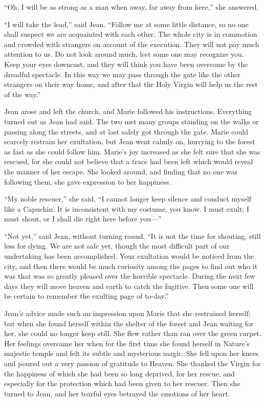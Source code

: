 ``Oh, I will be as strong as a man when away, far away from here,'' she
answered.

``I will take the lead,'' said Jean. ``Follow me at some little
distance, so no one shall suspect we are acquainted with each other. The
whole city is in commotion and crowded with strangers on account of the
execution. They will not pay much attention to us. Do not look around
much, lest some one may recognize you. Keep your eyes downcast, and they
will think you have been overcome by the dreadful spectacle. In this way
we may pass through the gate like the other strangers on their way home,
and after that the Holy Virgin will help us the rest of the way.''

Jean arose and left the church, and Marie followed his instructions.
Everything turned out as Jean had said. The two met many groups standing
on the walks or passing along the streets, and at last safely got
through the gate. Marie could scarcely restrain her exultation, but Jean
went calmly on, hurrying to the forest as fast as she could follow him.
Marie's joy increased as she felt sure that she was rescued, for she
could not believe that a trace had been left which would reveal the
manner of her escape. She looked around, and finding that no one was
following them, she gave expression to her happiness.

``My noble rescuer,'' she said, ``I cannot longer keep silence and
conduct myself like a Capuchin. It is inconsistent with my costume, you
know. I must exult; I must shout, or I shall die right here before
you---''

``Not yet,'' said Jean, without turning round. ``It is not the time for
shouting, still less for dying. We are not safe yet, though the most
difficult part of our undertaking has been accomplished. Your exultation
would be noticed from the city, and then there would be much curiosity
among the pages to find out who it was that was so greatly pleased over
the horrible spectacle. During the next few days they will move heaven
and earth to catch the fugitive. Then some one will be certain to
remember the exulting page of to-day.''

Jean's advice made such an impression upon Marie that she restrained
herself; but when she found herself within the shelter of the forest and
Jean waiting for her, she could no longer keep still. She flew rather
than ran over the green carpet. Her feelings overcame her when for the
first time she found herself in Nature's majestic temple and felt its
subtle and mysterious magic. She fell upon her knees and poured out a
very passion of gratitude to Heaven. She thanked the Virgin for the
happiness of which she had been so long deprived, for her rescue, and
especially for the protection which had been given to her rescuer. Then
she turned to Jean, and her tearful eyes betrayed the emotions of her
heart.

